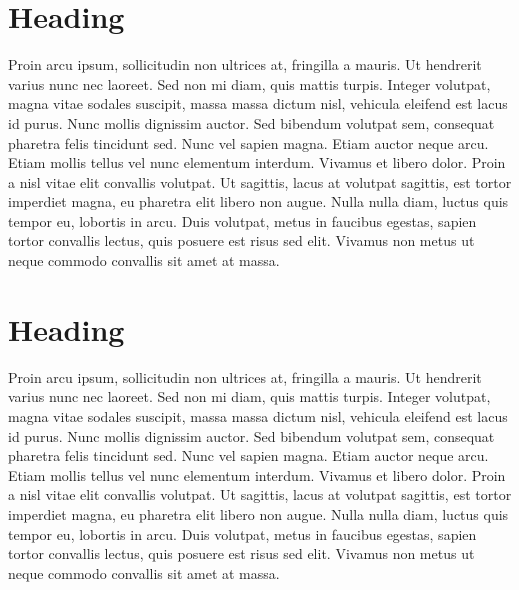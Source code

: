 \documentclass[10pt,a4paper]{article}
\begin{document}
\begin{multicols}{2}
\section{Heading}
Proin arcu ipsum, sollicitudin non ultrices at, fringilla a mauris. Ut hendrerit varius nunc nec laoreet. Sed non mi diam, quis mattis turpis. Integer volutpat, magna vitae sodales suscipit, massa massa dictum nisl, vehicula eleifend est lacus id purus. Nunc mollis dignissim auctor. Sed bibendum volutpat sem, consequat pharetra felis tincidunt sed. Nunc vel sapien magna. Etiam auctor neque arcu. Etiam mollis tellus vel nunc elementum interdum. Vivamus et libero dolor. Proin a nisl vitae elit convallis volutpat. Ut sagittis, lacus at volutpat sagittis, est tortor imperdiet magna, eu pharetra elit libero non augue. Nulla nulla diam, luctus quis tempor eu, lobortis in arcu. Duis volutpat, metus in faucibus egestas, sapien tortor convallis lectus, quis posuere est risus sed elit. Vivamus non metus ut neque commodo convallis sit amet at massa.

\section{Heading}
Proin arcu ipsum, sollicitudin non ultrices at, fringilla a mauris. Ut hendrerit varius nunc nec laoreet. Sed non mi diam, quis mattis turpis. Integer volutpat, magna vitae sodales suscipit, massa massa dictum nisl, vehicula eleifend est lacus id purus. Nunc mollis dignissim auctor. Sed bibendum volutpat sem, consequat pharetra felis tincidunt sed. Nunc vel sapien magna. Etiam auctor neque arcu. Etiam mollis tellus vel nunc elementum interdum. Vivamus et libero dolor. Proin a nisl vitae elit convallis volutpat. Ut sagittis, lacus at volutpat sagittis, est tortor imperdiet magna, eu pharetra elit libero non augue. Nulla nulla diam, luctus quis tempor eu, lobortis in arcu. Duis volutpat, metus in faucibus egestas, sapien tortor convallis lectus, quis posuere est risus sed elit. Vivamus non metus ut neque commodo convallis sit amet at massa.



\end{multicols}
\end{document}
